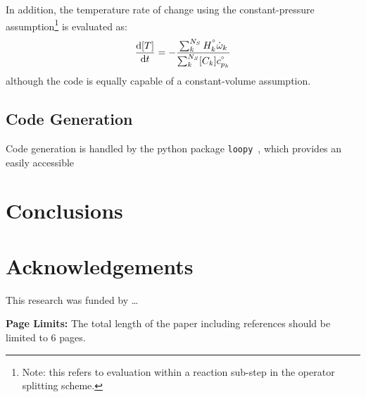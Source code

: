 \documentclass[12pt]{ussci}
\begin{document}
In addition, the temperature rate of change using the constant-pressure assumption\footnote{Note: this refers to evaluation within a reaction sub-step in the operator splitting scheme.} is evaluated as:
\begin{equation}
\frac{\text{d}[T]}{\text{d}t} = -\frac{\sum_{k}^{N_S} H^{\degree}_k \dot{\omega}_k}{\sum_{k}^{N_S} [C_k] c_{p_k}^{\degree}}
\end{equation}
although the code is equally capable of a constant-volume assumption.

\subsection{Code Generation}
Code generation is handled by the python package \texttt{loopy}~\cite{kloeckner_loopy_2014}, which provides an easily accessible 

\section{Conclusions}
%

\section{Acknowledgements}
This research was funded by \ldots

\noindent\textbf{Page Limits:} The total length of the paper including references should be limited to 6 pages.

\printbibliography[heading=bibintoc]
\end{document}
